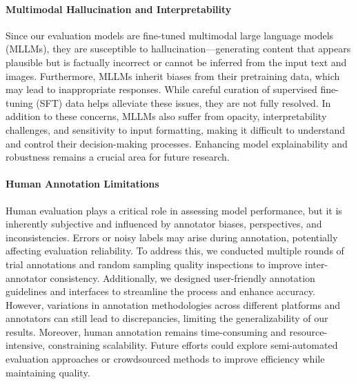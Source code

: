 \paragraph{Multimodal Hallucination and Interpretability}
Since our evaluation models are fine-tuned multimodal large language models (MLLMs), they are susceptible to hallucination—generating content that appears plausible but is factually incorrect or cannot be inferred from the input text and images. Furthermore, MLLMs inherit biases from their pretraining data, which may lead to inappropriate responses. While careful curation of supervised fine-tuning (SFT) data helps alleviate these issues, they are not fully resolved. In addition to these concerns, MLLMs also suffer from opacity, interpretability challenges, and sensitivity to input formatting, making it difficult to understand and control their decision-making processes. Enhancing model explainability and robustness remains a crucial area for future research.  

\paragraph{Human Annotation Limitations} 
Human evaluation plays a critical role in assessing model performance, but it is inherently subjective and influenced by annotator biases, perspectives, and inconsistencies. Errors or noisy labels may arise during annotation, potentially affecting evaluation reliability. To address this, we conducted multiple rounds of trial annotations and random sampling quality inspections to improve inter-annotator consistency. Additionally, we designed user-friendly annotation guidelines and interfaces to streamline the process and enhance accuracy. However, variations in annotation methodologies across different platforms and annotators can still lead to discrepancies, limiting the generalizability of our results. Moreover, human annotation remains time-consuming and resource-intensive, constraining scalability. Future efforts could explore semi-automated evaluation approaches or crowdsourced methods to improve efficiency while maintaining quality.  

